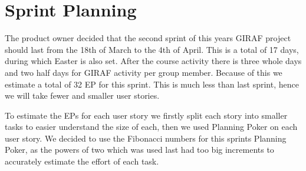 \chapter{Sprint Planning}
The product owner decided that the second sprint of this years GIRAF project should last from the 18th of March to the 4th of April.
This is a total of 17 days, during which Easter is also set. 
After the course activity there is three whole days and two half days for GIRAF activity per group member. 
Because of this we estimate a total of 32 EP for this sprint.
This is much less than last sprint, hence  we will take fewer and smaller user stories. 

To estimate the EPs for each user story we firstly split each story into smaller tasks to easier understand the size of each, then we used Planning Poker on each user story. 
We decided to use the Fibonacci numbers for this sprints Planning Poker, as the powers of two which was used last had too big increments to accurately estimate the effort of each task.
